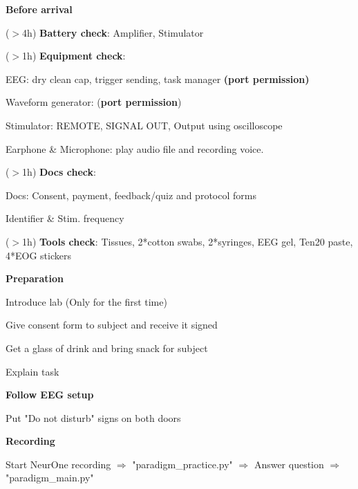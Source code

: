 \documentclass[journal, onecolumn, 11pt]{IEEEtran}
\begin{document}
\begin{itemize}
	\item \textbf{Before arrival}
	
		\item ($>$1h) \textbf{Docs check}: 
		\item ($>$1h) \textbf{Tools check}: Tissues, 2*cotton swabs, 2*syringes, EEG gel, Ten20 paste, 4*EOG stickers
	\end{todolist}
	\item \textbf{Preparation}
		\begin{todolist}
			\item Introduce lab (Only for the first time)
			\item Give consent form to subject and receive it signed
			\item Get a glass of drink and bring snack for subject
			\item Explain task
			\item \textbf{Follow EEG setup}
			\item Put "Do not disturb" signs on both doors
		\end{todolist}
	\item \textbf{Recording}
		\begin{todolist}
			\item Start NeurOne recording $\Rightarrow$ "paradigm\_practice.py" $\Rightarrow$ Answer question $\Rightarrow$ "paradigm\_main.py"
						

\end{todolist}
\end{itemize}
\end{document}

